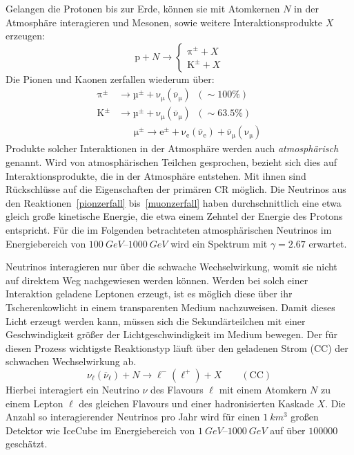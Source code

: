 Gelangen die Protonen bis zur Erde, können sie mit Atomkernen $N$ in der Atmosphäre interagieren und Mesonen, sowie weitere Interaktionsprodukte $X$ erzeugen:
\begin{equation}
    \label{proton-interaktion}
    \mathrm{p} + N \to
    \begin{cases}
        \mathrm{π}^± + X\\
        \mathrm{K}^± + X
    \end{cases}
\end{equation}
Die Pionen und Kaonen zerfallen wiederum über:
\begin{align}
    \mathrm{π}^\pm & \to  \mathrm{µ}^\pm + \mathrm{ν}_\mathrm{μ} (\overline{\mathrm{ν}}_\mathrm{μ}) \; \; (\sim 100\%)
    \label{pionzerfall} \\
    \mathrm{K}^\pm  & \to  \mathrm{µ}^\pm + \mathrm{ν}_\mathrm{μ} (\overline{\mathrm{ν}}_\mathrm{μ})\; \; (\sim 63.5\%)
    \label{kaonzerfall} \\
    &  \quad \; \, \, \mathrm{μ}^\pm  \to  \mathrm{e}^± + \mathrm{ν}_\mathrm{e}(\overline{\mathrm{ν}}_\mathrm{e}) +  \overline{\mathrm{ν}}_\mathrm{μ}(\mathrm{ν}_\mathrm{μ})
    \label{muonzerfall}
\end{align}
Produkte solcher Interaktionen in der Atmosphäre werden auch \emph{atmosphärisch} genannt. 
Wird von atmosphärischen Teilchen gesprochen, bezieht sich dies auf Interaktionsprodukte, die in der Atmosphäre entstehen.
Mit ihnen sind Rückschlüsse auf die Eigenschaften der primären CR möglich.
Die Neutrinos aus den Reaktionen~\eqref{pionzerfall} bis~\eqref{muonzerfall} haben durchschnittlich eine etwa gleich große kinetische Energie, die etwa einem Zehntel der Energie des Protons entspricht.
Für die im Folgenden betrachteten atmosphärischen Neutrinos im Energiebereich von $\SIrange{100}{1000}{GeV}$ wird ein Spektrum mit $γ = 2.67$ erwartet.
\cite{pdg2014, WiebelSoothBiermannMeyer, gaisser2016cosmic}

Neutrinos interagieren nur über die schwache Wechselwirkung, womit sie nicht auf direktem Weg nachgewiesen werden können. 
Werden bei solch einer Interaktion geladene Leptonen erzeugt, ist es möglich diese über ihr Tscherenkowlicht in einem transparenten Medium nachzuweisen.
Damit dieses Licht erzeugt werden kann, müssen sich die Sekundärteilchen mit einer Geschwindigkeit größer der Lichtgeschwindigkeit im Medium bewegen.
Der für diesen Prozess wichtigste Reaktionstyp läuft über den geladenen Strom (CC) der schwachen Wechselwirkung ab. 
\begin{equation}
    \nu _\ell (\overline{\nu} _\ell ) + N  \to \ell ^- (\ell ^+)+ X \qquad (\text{CC})
    \label{cc}
\end{equation}
Hierbei interagiert ein Neutrino $ν$ des Flavours $\ell$ mit einem Atomkern $N$ zu einem Lepton $\ell$ des gleichen Flavours und einer hadronisierten Kaskade $X$.
Die Anzahl so interagierender Neutrinos pro Jahr wird für einen $\SI{1}{km^3}$ großen Detektor wie IceCube im Energiebereich von $\SIrange{1}{1000}{GeV}$ auf über $\num{100000}$ geschätzt.


